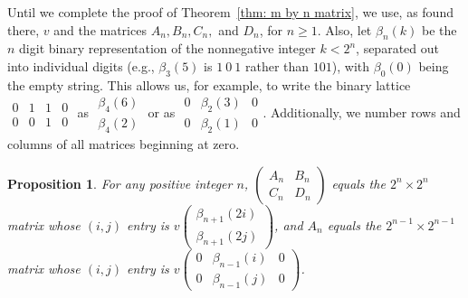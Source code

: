 \documentclass[12pt]{article}
\theoremstyle{plain}
\newtheorem{prop}[thm]{Proposition}
\theoremstyle{remark}
\theoremstyle{definition}
\theoremstyle{remark}
\theoremstyle{definition}
\begin{document}
Until we complete the proof of Theorem~\ref{thm: m by n matrix}, we use, as found there, $v$ and the matrices $A_{n},B_{n},C_{n},$ and $D_{n}$, for $n\ge1$. Also, let $\beta_{n}(k)$ be the $n$ digit binary representation of the nonnegative integer $k<2^{n}$, separated out into individual digits (e.g., $\beta_{3}\left(5\right)$ is $1\ 0\ 1$ rather than $101$), with $\beta_{0}\left(0\right)$ being the empty string. This allows us, for example, to write the binary lattice $\begin{smallmatrix}0 & 1 & 1 & 0\\ 0 & 0 & 1 & 0 \end{smallmatrix}$ as $\begin{smallmatrix}\beta_{4}\left(6\right)\\ \beta_{4}\left(2\right) \end{smallmatrix}$ or as $\begin{smallmatrix}0 & \beta_{2}\left(3\right) & 0\\ 0 & \beta_{2}\left(1\right) & 0 \end{smallmatrix}$. Additionally, we number rows and columns of all matrices beginning at zero.

\begin{prop}
\label{prop: one by n matrix} For any positive integer $n$, $\begin{pmatrix}A_{n} & B_{n}\\
C_{n} & D_{n}
\end{pmatrix}$ equals the $2^{n}\times2^{n}$ matrix whose $\left(i,j\right)$ entry
is $v\left(\begin{smallmatrix}\beta_{n+1}\left(2i\right)\\
\beta_{n+1}\left(2j\right)
\end{smallmatrix}\right)$, and $A_{n}$ equals the $2^{n-1}\times2^{n-1}$ matrix whose $\left(i,j\right)$
entry is $v\left(\begin{smallmatrix}0 & \beta_{n-1}\left(i\right) & 0\\
0 & \beta_{n-1}\left(j\right) & 0
\end{smallmatrix}\right)$.
\end{prop}
\end{document}
